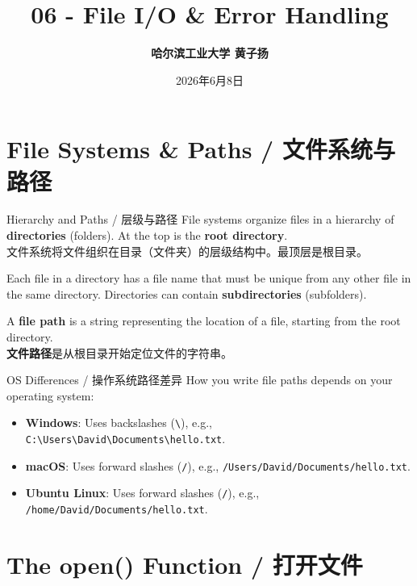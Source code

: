 \documentclass[11pt,a4paper]{article}
\title{\Huge \bfseries 06 - File I/O \& Error Handling}
\author{\Large \textbf{哈尔滨工业大学 \quad 黄子扬}}
\date{2026年6月8日}
\begin{document}
\maketitle
\tableofcontents
\newpage

\section{File Systems \& Paths / 文件系统与路径}

\begin{concept}{Hierarchy and Paths / 层级与路径}
    File systems organize files in a hierarchy of \textbf{directories} (folders). At the top is the \textbf{root directory}. \\
    文件系统将文件组织在目录（文件夹）的层级结构中。最顶层是根目录。

    Each file in a directory has a file name that must be unique from any other file in the same directory. Directories can contain \textbf{subdirectories} (subfolders).

    A \textbf{file path} is a string representing the location of a file, starting from the root directory. \\
    \textbf{文件路径}是从根目录开始定位文件的字符串。
\end{concept}

\begin{warning}{OS Differences / 操作系统路径差异}
    How you write file paths depends on your operating system:
    \begin{itemize}
        \item \textbf{Windows}: Uses backslashes (\texttt{\textbackslash}), e.g., \texttt{C:\textbackslash Users\textbackslash David\textbackslash Documents\textbackslash hello.txt}.
        \item \textbf{macOS}: Uses forward slashes (\texttt{/}), e.g., \texttt{/Users/David/Documents/hello.txt}.
        \item \textbf{Ubuntu Linux}: Uses forward slashes (\texttt{/}), e.g., \texttt{/home/David/Documents/hello.txt}.
    \end{itemize}
\end{warning}

\section{The open() Function / 打开文件}
\end{document}
